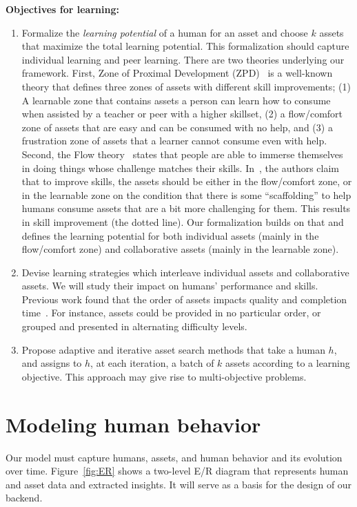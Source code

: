 \documentclass[11pt]{article}
\begin{document}
{\bf Objectives for learning:}
\begin{enumerate}
  \item Formalize the {\it learning potential} of a human for an asset and choose $k$ assets that maximize the total learning potential. This formalization should capture individual learning and peer learning.
There are two theories underlying our framework.
First, Zone of Proximal Development (ZPD)~\cite{VYG87} is a well-known theory that defines three zones of assets with different skill improvements; (1) A learnable zone that contains assets a person can learn how to consume when assisted by a teacher or peer with a higher skillset, (2) a flow/comfort zone of assets that are easy and can be consumed with no help, and (3) a frustration zone of assets that a learner cannot consume even with help.
Second, the Flow theory~\cite{CSI75} states that people are able to immerse themselves in doing things whose challenge matches their skills. %
In~\cite{BRK+13}, the authors claim that to improve skills, the assets should be either in the flow/comfort zone, or in the learnable zone on the condition that there is some ``scaffolding'' to help humans consume assets that are a bit more challenging for them. This results in skill improvement (the dotted line).
Our formalization builds on that and defines the learning potential for both individual assets (mainly in the flow/comfort zone) and collaborative assets (mainly in the learnable zone).

\item Devise learning strategies which interleave individual assets and collaborative assets. We will study their impact on humans' performance and skills. Previous work found that the order of assets impacts quality and completion time~\cite{DRP+15,CIT16}. For instance, assets could be provided in no particular order, or grouped and presented in alternating difficulty levels. 

\item Propose adaptive and iterative asset search methods that take a human $h$, and assigns to $h$, at each iteration, a batch of $k$ assets according to a learning objective. This approach may give rise to multi-objective problems.
\end{enumerate}

\section{Modeling human behavior}
Our model must capture humans, assets, and human behavior and its evolution over time. 
Figure~\ref{fig:ER} shows a two-level E/R diagram that represents human and asset data and extracted insights. It will serve as a basis for the design of our backend.
\end{document}
